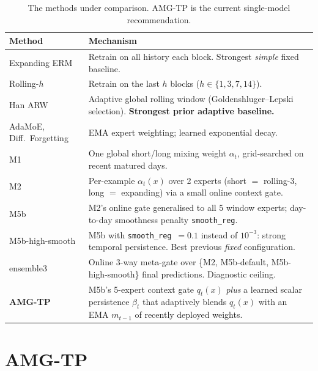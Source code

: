 \documentclass[11pt]{article}
\begin{document}
\begin{table}[H]
\centering
\small
\begin{tabular}{@{}lp{11.2cm}@{}}
\toprule
Method & Mechanism \\
\midrule
Expanding ERM & Retrain on all history each block. Strongest \emph{simple} fixed baseline. \\
Rolling-$h$ & Retrain on the last $h$ blocks ($h\in\{1,3,7,14\}$). \\
Han ARW & Adaptive global rolling window (Goldenshluger--Lepski selection). \textbf{Strongest prior adaptive baseline.} \\
AdaMoE, Diff.\ Forgetting & EMA expert weighting; learned exponential decay. \\
M1 & One global short/long mixing weight $\alpha_t$, grid-searched on recent matured days. \\
M2 & Per-example $\alpha_t(x)$ over 2 experts (short $=$ rolling-3, long $=$ expanding) via a small online context gate. \\
M5b & M2's online gate generalised to all 5 window experts; day-to-day smoothness penalty \texttt{smooth\_reg}. \\
M5b-high-smooth & M5b with \texttt{smooth\_reg}~$=0.1$ instead of $10^{-3}$: strong temporal persistence. Best previous \emph{fixed} configuration. \\
ensemble3 & Online 3-way meta-gate over \{M2, M5b-default, M5b-high-smooth\} final predictions. Diagnostic ceiling. \\
\midrule
\textbf{AMG-TP} & M5b's 5-expert context gate $q_t(x)$ \emph{plus} a learned scalar persistence $\beta_t$ that adaptively blends $q_t(x)$ with an EMA $m_{t-1}$ of recently deployed weights. \\
\bottomrule
\end{tabular}
\caption{The methods under comparison. AMG-TP is the current single-model
recommendation.}
\end{table}

\section{AMG-TP}
\end{document}
